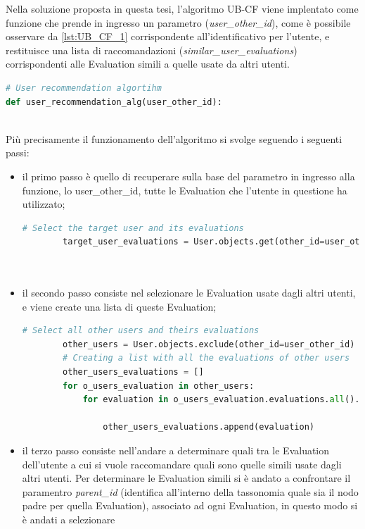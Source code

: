 Nella soluzione proposta in questa tesi, l'algoritmo UB-CF viene implentato come funzione che prende in ingresso un parametro 
(\textit{user\_other\_id}), come è possibile osservare da \ref{lst:UB_CF_1} corrispondente all'identificativo per l'utente, 
e restituisce una lista di raccomandazioni (\textit{similar\_user\_evaluations}) corrispondenti alle Evaluation simili a quelle usate 
da altri utenti. 

\lstset{style=python_code_style}
\begin{lstlisting}[language=Python, label=lst:UB_CF_1]
# User recommendation algortihm
def user_recommendation_alg(user_other_id):
\end{lstlisting}
\ \\
Più precisamente il funzionamento dell'algoritmo si svolge seguendo i seguenti passi:
\begin{itemize}
	\item il primo passo è quello di recuperare sulla base del parametro in ingresso alla funzione, lo user\_other\_id,
	tutte le Evaluation che l'utente in questione ha utilizzato;
	\begin{lstlisting}[language=Python, label=lst:UB_CF_2]
		# Select the target user and its evaluations
		target_user_evaluations = User.objects.get(other_id=user_other_id).evaluations.all()\
																					.values('other_id', 'id', 'parent_id')\
																					.order_by('other_id')
	\end{lstlisting}
	\item il secondo passo consiste nel selezionare le Evaluation usate dagli altri utenti, e viene create una lista di queste Evaluation;
	\begin{lstlisting}[language=Python, label=lst:UB_CF_3]
		# Select all other users and theirs evaluations
		other_users = User.objects.exclude(other_id=user_other_id)
		# Creating a list with all the evaluations of other users
		other_users_evaluations = []
		for o_users_evaluation in other_users:
			for evaluation in o_users_evaluation.evaluations.all().values('other_id', 'id', 'parent_id')\
																	.order_by('other_id'):
				other_users_evaluations.append(evaluation)
	\end{lstlisting}
	\item il terzo passo consiste nell'andare a determinare quali tra le Evaluation dell'utente a cui si vuole raccomandare quali sono quelle 
	simili usate dagli altri utenti. Per determinare le Evaluation simili si è andato a confrontare il paramentro \textit{parent\_id} (identifica
	all'interno della tassonomia quale sia il nodo padre per quella Evaluation), associato ad ogni Evaluation, in questo modo si è andati a selezionare

\end{itemize}
